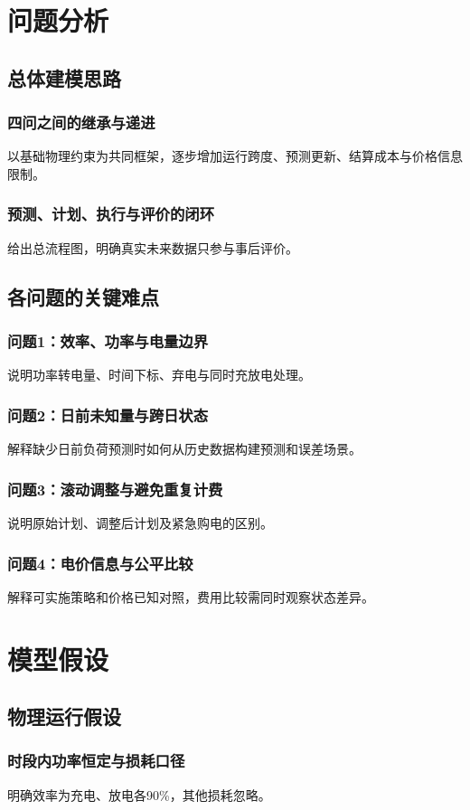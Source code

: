 \documentclass[UTF8,a4paper,zihao=-4]{ctexart}
\begin{document}
\section{问题分析}
\subsection{总体建模思路}
\subsubsection{四问之间的继承与递进}以基础物理约束为共同框架，逐步增加运行跨度、预测更新、结算成本与价格信息限制。
\subsubsection{预测、计划、执行与评价的闭环}给出总流程图，明确真实未来数据只参与事后评价。
\subsection{各问题的关键难点}
\subsubsection{问题1：效率、功率与电量边界}说明功率转电量、时间下标、弃电与同时充放电处理。
\subsubsection{问题2：日前未知量与跨日状态}解释缺少日前负荷预测时如何从历史数据构建预测和误差场景。
\subsubsection{问题3：滚动调整与避免重复计费}说明原始计划、调整后计划及紧急购电的区别。
\subsubsection{问题4：电价信息与公平比较}解释可实施策略和价格已知对照，费用比较需同时观察状态差异。
\section{模型假设}
\subsection{物理运行假设}
\subsubsection{时段内功率恒定与损耗口径}明确效率为充电、放电各90\%，其他损耗忽略。
\end{document}
